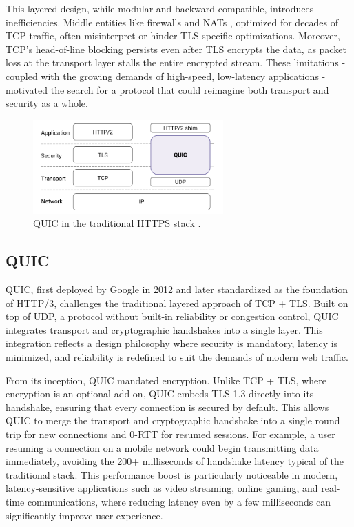 This layered design, while modular and backward-compatible, introduces inefficiencies. Middle entities like firewalls and NATs \cite{langley2017quic}, optimized for decades of TCP traffic, often misinterpret or hinder TLS-specific optimizations. Moreover, TCP's head-of-line blocking persists even after TLS encrypts the data, as packet loss at the transport layer stalls the entire encrypted stream. These limitations - coupled with the growing demands of high-speed, low-latency applications - motivated the search for a protocol that could reimagine both transport and security as a whole.

\begin{figure}[!b]
	\centering
	\includegraphics[width=0.65\textwidth]{images/quic-stack.png}
	\caption{QUIC in the traditional HTTPS stack
	\cite{langley2017quic}.}
\end{figure}

\subsection{QUIC}
QUIC, first deployed by Google in 2012 and later standardized as the foundation of HTTP/3, challenges the traditional layered approach of TCP + TLS. Built on top of UDP, a protocol without built-in reliability or congestion control, QUIC integrates transport and cryptographic handshakes into a single layer. This integration reflects a design philosophy where security is mandatory, latency is minimized, and reliability is redefined to suit the demands of modern web traffic.

From its inception, QUIC mandated encryption. Unlike TCP + TLS, where encryption is an optional add-on, QUIC embeds TLS 1.3 directly into its handshake, ensuring that every connection is secured by default. This allows QUIC to merge the transport and cryptographic handshake into a single round trip for new connections and 0-RTT for resumed sessions. For example, a user resuming a connection on a mobile network could begin transmitting data immediately, avoiding the 200+ milliseconds of handshake latency typical of the traditional stack. This performance boost is particularly noticeable in modern, latency-sensitive applications such as video streaming, online gaming, and real-time communications, where reducing latency even by a few milliseconds can significantly improve user experience.

